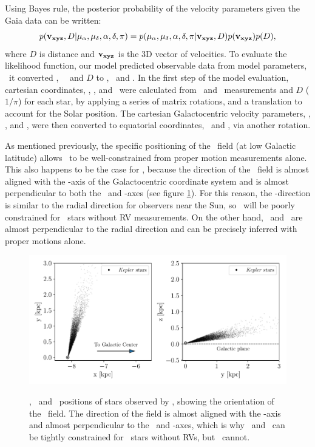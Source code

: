 Using Bayes rule, the posterior probability of the velocity parameters given
the Gaia data can be written:
\begin{equation}
    p({\bf v_{xyz}}, D | \mu_{\alpha}, \mu_{\delta}, \alpha, \delta, \pi) =
    p(\mu_{\alpha}, \mu_{\delta}, \alpha, \delta, \pi | {\bf v_{xyz}}, D)
    p({\bf v_{xyz}}) p(D),
\end{equation}
where $D$ is distance and ${\bf v_{xyz}}$ is the 3D vector of velocities.
To evaluate the likelihood function, our model predicted observable data from
model parameters, \ie\ it converted \vx, \vy\, \vz\ and $D$ to \pmra, \pmdec\
and \parallax.
In the first step of the model evaluation, cartesian coordinates, \x, \y, and
\z\, were calculated from \ra\ and \dec\ measurements and $D$ ($1/\pi$) for
each star, by applying a series of matrix rotations, and a translation to
account for the Solar position.  The cartesian Galactocentric velocity
parameters, \vx, \vy, and \vz, were then converted to equatorial coordinates,
\pmra\ and \pmdec, via another rotation.

As mentioned previously, the specific positioning of the \kepler\ field (at
low Galactic latitude) allows \vz\ to be well-constrained from proper motion
measurements alone.
This also happens to be the case for \vx, because the direction of the
\kepler\ field is almost aligned with the \y-axis of the Galactocentric
coordinate system and is almost perpendicular to both the \x\ and \z-axes (see
figure \ref{fig:kepler_field}).
For this reason, the \y-direction is similar to the radial direction for
observers near the Sun, so \vy\ will be poorly constrained for \kepler\ stars
without RV measurements.
On the other hand, \vx\ and \vz\ are almost perpendicular to the radial
direction and can be precisely inferred with proper motions alone.
\begin{figure}[ht!]
\caption{
\x, \y\ and \z\ positions of stars observed by \kepler, showing the
    orientation of the \kepler\ field.
The direction of the field is almost aligned with the \y-axis and almost
    perpendicular to the \x\ and \z-axes, which is why \vx\ and \vz\ can be
    tightly constrained for \kepler\ stars without RVs, but \vy\ cannot.
}
  \centering
    \includegraphics[width=.7\textwidth]{kepler_field}
\label{fig:kepler_field}
\end{figure}

